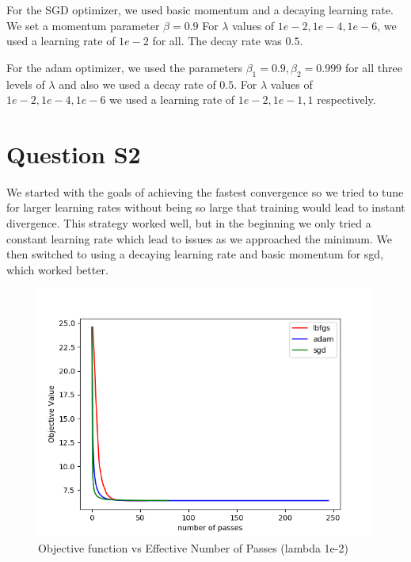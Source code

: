 \documentclass[11pt]{report}
\begin{document}
For the SGD optimizer, we used basic
momentum and a decaying learning rate. We set a momentum parameter $\beta = 0.9$
For $\lambda$ values of $1e-2, 1e-4, 1e-6$, we used a learning rate of $1e-2$ for
all. The decay rate was $0.5$.


For the adam optimizer, we used the 
parameters $\beta_1 = 0.9, \beta_2 = 0.999$ for all three levels of $\lambda$ and 
also we used a decay rate of $0.5$. For $\lambda$ values of $1e-2, 1e-4, 1e-6$ 
we used a learning rate of $1e-2, 1e-1, 1$ respectively.

\section*{Question S2}
We started with the goals of achieving the fastest convergence so we tried to
tune for larger learning rates without being so large that training would lead
to instant divergence. This strategy worked well, but in the beginning we only
tried a constant learning rate which lead to issues as we approached the minimum.
We then switched to using a decaying learning rate and basic momentum for sgd, which
worked better.

\begin{figure}[b]
\centering
\includegraphics[scale=0.4]{objval_ef_1e2.png}
\caption{Objective function vs Effective Number of Passes (lambda 1e-2)}
\end{figure}
\end{document}
